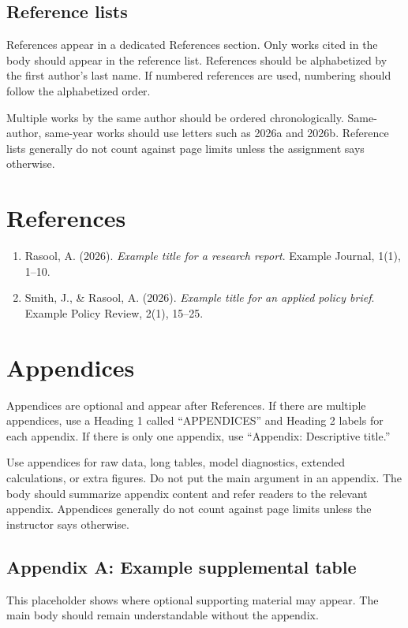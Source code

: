 \documentclass[11pt,letterpaper]{article}
\begin{document}
\subsection{Reference lists}

References appear in a dedicated References section. Only works cited
in the body should appear in the reference list. References should be
alphabetized by the first author's last name. If numbered references
are used, numbering should follow the alphabetized order.

Multiple works by the same author should be ordered chronologically.
Same-author, same-year works should use letters such as 2026a and
2026b. Reference lists generally do not count against page limits unless
the assignment says otherwise.

\section{References}

\begin{enumerate}
\item Rasool, A. (2026). \textit{Example title for a research report}.
Example Journal, 1(1), 1--10.
\item Smith, J., \& Rasool, A. (2026). \textit{Example title for an
applied policy brief}. Example Policy Review, 2(1), 15--25.
\end{enumerate}

\section{Appendices}

Appendices are optional and appear after References. If there are multiple appendices,
use a Heading 1 called ``APPENDICES'' and Heading 2 labels for each
appendix. If there is only one appendix, use ``Appendix: Descriptive
title.''

Use appendices for raw data, long tables, model diagnostics, extended
calculations, or extra figures. Do not put the main argument in an
appendix. The body should summarize appendix content and refer readers
to the relevant appendix. Appendices generally do not count against page
limits unless the instructor says otherwise.

\subsection{Appendix A: Example supplemental table}

This placeholder shows where optional supporting material may appear.
The main body should remain understandable without the appendix.
\end{document}

